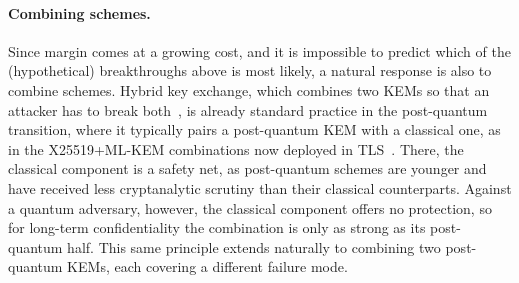 
\paragraph{Combining schemes.}Since margin comes at a growing cost, and it is impossible to predict which of the (hypothetical) breakthroughs above is most likely,
a natural response is also to combine schemes.
Hybrid key exchange, which combines two KEMs so that an attacker has to break both~\cite{PKC:GiaHeuPoe18,PQCRYPTO:BBFGS19},
is already standard practice in the post-quantum transition, where it typically pairs a post-quantum KEM with a classical one,
as in the X25519+ML-KEM combinations now deployed in TLS~\cite{tls-hybrid}. There, the classical component is a safety net, as
post-quantum schemes are younger and have received less cryptanalytic scrutiny than their classical counterparts.
Against a quantum adversary, however, the classical component offers no protection, so for long-term confidentiality the combination
is only as strong as its post-quantum half. This same principle extends naturally to combining two post-quantum KEMs, each covering
a different failure mode.

